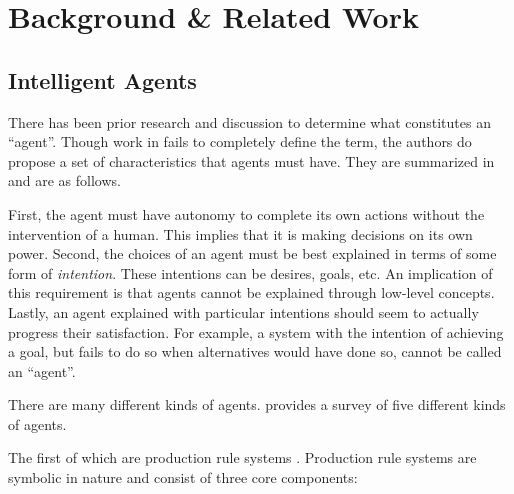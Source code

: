 \chapter{Background \& Related Work}
\label{ch:background}

%
%
%

\section{Intelligent Agents}
\label{sec:agents}

There has been prior research and discussion to determine what constitutes an ``agent''.
Though work in \cite{wooldridge_agent_1995} fails to completely define the term,
the authors do propose a set of characteristics that agents must have.
They are summarized in \cite{dignum_intentional_1998} and are as follows.

First, the agent must have autonomy to complete its own actions without the intervention of a human.
This implies that it is making decisions on its own power.
Second, the choices of an agent must be best explained in terms of some form of \textit{intention}.
These intentions can be desires, goals, etc.
An implication of this requirement is that agents cannot be explained through low-level concepts.
Lastly, an agent explained with particular intentions should seem to actually progress their satisfaction.
For example, a system with the intention of achieving a goal,
but fails to do so when alternatives would have done so, cannot be called an ``agent''.

There are many different kinds of agents.
\cite{balke_how_2014} provides a survey of five different kinds of agents.

The first of which are production rule systems \cite{balke_how_2014}.
Production rule systems are symbolic in nature and
consist of three core components:

